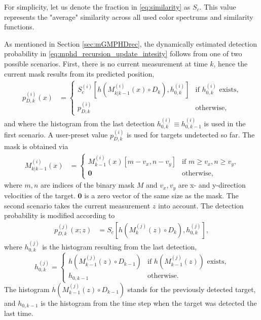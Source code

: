 For simplicity, let us denote the fraction in \eqref{eq:similarity} as $S_c$. This value represents the "average"
similarity across all used color spectrums and similarity functions.

As mentioned in Section \ref{sec:mGMPHDrec}, the dynamically estimated detection probability in \eqref{eq:mphd_recursion_update_intesity} follows from one of two possible scenarios. First, there is no current measurement at
time $k$, hence the current mask results from its predicted position,
\begin{align}
  \label{eq:mphd_recursion_update_intesity_misdetect_pd}
  p_{D,k}^{(i)}(x) &=
  \begin{cases}
     S_c^{(i)}\left[h(M_{k|k-1}^{(i)}(x) \circ D_k), h_{0,k}^{(i)}\right] &\text{if $h_{0,k}^{(i)}$ exists,} \\
     p_{D,k}^{(i)} \quad& \text{otherwise,}
  \end{cases}
\end{align}
and where the histogram from the last detection $h_{0,k}^{(i)} \equiv  h_{0,k-1}^{(i)}$ is used in the first scenario. A user-preset value $p_{D,k}^{(i)}$ is used for targets undetected so far. The mask is obtained via
\begin{align}
  \label{eq:mphd_recursion_update_intesity_misdetect_M_shifted}
  M_{k|k-1}^{(i)}(x) &=
  \begin{cases}
    \!M_{k-1}^{(i)}(x)[m-v_x, n-v_y] &\text{if $m\geq v_x, n\geq v_y$,} \\
    \mathbf{0} \quad &\text{otherwise,}
  \end{cases}
\end{align}
where $m, n$ are indices of the binary mask $M$ and $v_x, v_y$ are x- and y-direction velocities of the target. $\mathbf{0}$ is a zero vector of the same size as the mask. The second scenario takes the current measurement $z$ into account. The detection probability is modified according to
\begin{align}
  p_{D,k}^{(j)}(x;z) &= S_c\left[h(M_{k}^{(j)}(z) \circ D_k), h_{0,k}^{(j)}\right], \label{eq:mphd_recursion_update_intesity_misdetect_z_pd}
\end{align}
where $h_{0,k}^{(j)}$ is the histogram resulting from the last detection,
\begin{equation}
  \label{eq:mphd_recursion_update_intesity_misdetect_Hist}
  h_{0,k}^{(j)} =
  \begin{cases}
    h(M_{k-1}^{(j)}(z) \circ D_{k-1}) &\text{if } h(M_{k-1}^{(j)}(z)) \text{ exists,} \\
    h_{0,k-1} &\text{otherwise.}
  \end{cases}
\end{equation}
The histogram $h(M_{k-1}^{(j)}(z) \circ D_{k-1})$ stands for the previously detected target, and $h_{0,k-1}$ is the histogram from the time step when the target was detected the last time.



